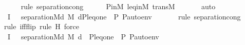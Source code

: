 \begin{isabellebody}
\ \ \ \ \isamarkupfalse%
{\isacharparenleft}{\kern0pt}rule\ separation{\isacharunderscore}{\kern0pt}cong{\isacharparenright}{\kern0pt}\isanewline
\ \ \ \ \isamarkupfalse%
\ P{\isacharunderscore}{\kern0pt}in{\isacharunderscore}{\kern0pt}M\ leq{\isacharunderscore}{\kern0pt}in{\isacharunderscore}{\kern0pt}M\ transM\ \isanewline
\ \ \ \ \isamarkupfalse%
\ auto\isanewline
\ \ \isamarkupfalse%
\ I{}{\isacharcolon}{\kern0pt}\ {\isachardoublequoteopen}{\isachardot}{\kern0pt}{\isachardot}{\kern0pt}{\isachardot}{\kern0pt}\ {\isasymlongleftrightarrow}\ separation{\isacharparenleft}{\kern0pt}{\isacharhash}{\kern0pt}{\isacharhash}{\kern0pt}M{\isacharcomma}{\kern0pt}{\isasymlambda}d{\isachardot}{\kern0pt}\ {\isacharparenleft}{\kern0pt}M{\isacharcomma}{\kern0pt}\ {\isacharbrackleft}{\kern0pt}d{\isacharcomma}{\kern0pt}P{\isacharcomma}{\kern0pt}leq{\isacharcomma}{\kern0pt}one{\isacharcomma}{\kern0pt}{\isasymlangle}{\isasymF}{\isacharcomma}{\kern0pt}\ {\isasymG}{\isacharcomma}{\kern0pt}\ P{\isacharcomma}{\kern0pt}\ P{\isacharunderscore}{\kern0pt}auto{\isasymrangle}{\isacharbrackright}{\kern0pt}{\isacharat}{\kern0pt}env\ {\isasymTurnstile}\ {\isacharquery}{\kern0pt}{\isasympsi}{\isacharparenright}{\kern0pt}{\isacharparenright}{\kern0pt}{\isachardoublequoteclose}\isanewline
\ \ \ \ \isamarkupfalse%
{\isacharparenleft}{\kern0pt}rule\ separation{\isacharunderscore}{\kern0pt}cong{\isacharparenright}{\kern0pt}\isanewline
\ \ \ \ \isamarkupfalse%
{\isacharparenleft}{\kern0pt}rule\ iff{\isacharunderscore}{\kern0pt}flip{\isacharcomma}{\kern0pt}\ rule\ H{\isacharcomma}{\kern0pt}\ force{\isacharparenright}{\kern0pt}\isanewline
\ \ \ \ \isamarkupfalse%
\isanewline
\ \ \isamarkupfalse%
\ I{}{\isacharcolon}{\kern0pt}\ {\isachardoublequoteopen}{\isachardot}{\kern0pt}{\isachardot}{\kern0pt}{\isachardot}{\kern0pt}\ {\isasymlongleftrightarrow}\ separation{\isacharparenleft}{\kern0pt}{\isacharhash}{\kern0pt}{\isacharhash}{\kern0pt}M{\isacharcomma}{\kern0pt}{\isasymlambda}d{\isachardot}{\kern0pt}\ {\isacharparenleft}{\kern0pt}M{\isacharcomma}{\kern0pt}\ {\isacharbrackleft}{\kern0pt}d{\isacharbrackright}{\kern0pt}\ {\isacharat}{\kern0pt}\ {\isacharbrackleft}{\kern0pt}P{\isacharcomma}{\kern0pt}leq{\isacharcomma}{\kern0pt}one{\isacharcomma}{\kern0pt}{\isasymlangle}{\isasymF}{\isacharcomma}{\kern0pt}\ {\isasymG}{\isacharcomma}{\kern0pt}\ P{\isacharcomma}{\kern0pt}\ P{\isacharunderscore}{\kern0pt}auto{\isasymrangle}{\isacharbrackright}{\kern0pt}{\isacharat}{\kern0pt}env\ {\isasymTurnstile}\ {\isacharquery}{\kern0pt}{\isasympsi}{\isacharparenright}{\kern0pt}{\isacharparenright}{\kern0pt}{\isachardoublequoteclose}\ \isamarkupfalse%

\end{isabellebody}
